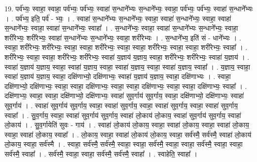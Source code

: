 \documentclass[17pt]{extarticle}
\begin{document}
19. पर्व॑भ्यः॒ स्वाहा॒ स्वाहा॒ पर्व॑भ्यः॒ पर्व॑भ्यः॒ स्वाहा॑ स॒न्धाने᳚भ्यः स॒न्धाने᳚भ्यः॒ स्वाहा॒ पर्व॑भ्यः॒ पर्व॑भ्यः॒ स्वाहा॑ स॒न्धाने᳚भ्यः । . पर्व॑भ्य॒ इति॒ पर्व॑ - भ्यः॒ । . स्वाहा॑ स॒न्धाने᳚भ्यः स॒न्धाने᳚भ्यः॒ स्वाहा॒ स्वाहा॑ स॒न्धाने᳚भ्यः॒ स्वाहा॒ स्वाहा॑ स॒न्धाने᳚भ्यः॒ स्वाहा॒ स्वाहा॑ स॒न्धाने᳚भ्यः॒ स्वाहा᳚ । . स॒न्धाने᳚भ्यः॒ स्वाहा॒ स्वाहा॑ स॒न्धाने᳚भ्यः स॒न्धाने᳚भ्यः॒ स्वाहा॒ शरी॑रेभ्यः॒ शरी॑रेभ्यः॒ स्वाहा॑ स॒न्धाने᳚भ्यः स॒न्धाने᳚भ्यः॒ स्वाहा॒ शरी॑रेभ्यः । . स॒न्धाने᳚भ्य॒ इति॑ सं - धाने᳚भ्यः । . स्वाहा॒ शरी॑रेभ्यः॒ शरी॑रेभ्यः॒ स्वाहा॒ स्वाहा॒ शरी॑रेभ्यः॒ स्वाहा॒ स्वाहा॒ शरी॑रेभ्यः॒ स्वाहा॒ स्वाहा॒ शरी॑रेभ्यः॒ स्वाहा᳚ । . शरी॑रेभ्यः॒ स्वाहा॒ स्वाहा॒ शरी॑रेभ्यः॒ शरी॑रेभ्यः॒ स्वाहा॑ य॒ज्ञाय॑ य॒ज्ञाय॒ स्वाहा॒ शरी॑रेभ्यः॒ शरी॑रेभ्यः॒ स्वाहा॑ य॒ज्ञाय॑ । . स्वाहा॑ य॒ज्ञाय॑ य॒ज्ञाय॒ स्वाहा॒ स्वाहा॑ य॒ज्ञाय॒ स्वाहा॒ स्वाहा॑ य॒ज्ञाय॒ स्वाहा॒ स्वाहा॑ य॒ज्ञाय॒ स्वाहा᳚ । . य॒ज्ञाय॒ स्वाहा॒ स्वाहा॑ य॒ज्ञाय॑ य॒ज्ञाय॒ स्वाहा॒ दक्षि॑णाभ्यो॒ दक्षि॑णाभ्यः॒ स्वाहा॑ य॒ज्ञाय॑ य॒ज्ञाय॒ स्वाहा॒ दक्षि॑णाभ्यः । . स्वाहा॒ दक्षि॑णाभ्यो॒ दक्षि॑णाभ्यः॒ स्वाहा॒ स्वाहा॒ दक्षि॑णाभ्यः॒ स्वाहा॒ स्वाहा॒ दक्षि॑णाभ्यः॒ स्वाहा॒ स्वाहा॒ दक्षि॑णाभ्यः॒ स्वाहा᳚ । . दक्षि॑णाभ्यः॒ स्वाहा॒ स्वाहा॒ दक्षि॑णाभ्यो॒ दक्षि॑णाभ्यः॒ स्वाहा॑ सुव॒र्गाय॑ सुव॒र्गाय॒ स्वाहा॒ दक्षि॑णाभ्यो॒ दक्षि॑णाभ्यः॒ स्वाहा॑ सुव॒र्गाय॑ । . स्वाहा॑ सुव॒र्गाय॑ सुव॒र्गाय॒ स्वाहा॒ स्वाहा॑ सुव॒र्गाय॒ स्वाहा॒ स्वाहा॑ सुव॒र्गाय॒ स्वाहा॒ स्वाहा॑ सुव॒र्गाय॒ स्वाहा᳚ । . सु॒व॒र्गाय॒ स्वाहा॒ स्वाहा॑ सुव॒र्गाय॑ सुव॒र्गाय॒ स्वाहा॑ लो॒काय॑ लो॒काय॒ स्वाहा॑ सुव॒र्गाय॑ सुव॒र्गाय॒ स्वाहा॑ लो॒काय॑ । . सु॒व॒र्गायेति॑ सुवः - गाय॑ । . स्वाहा॑ लो॒काय॑ लो॒काय॒ स्वाहा॒ स्वाहा॑ लो॒काय॒ स्वाहा॒ स्वाहा॑ लो॒काय॒ स्वाहा॒ स्वाहा॑ लो॒काय॒ स्वाहा᳚ । . लो॒काय॒ स्वाहा॒ स्वाहा॑ लो॒काय॑ लो॒काय॒ स्वाहा॒ सर्व॑स्मै॒ सर्व॑स्मै॒ स्वाहा॑ लो॒काय॑ लो॒काय॒ स्वाहा॒ सर्व॑स्मै । . स्वाहा॒ सर्व॑स्मै॒ सर्व॑स्मै॒ स्वाहा॒ स्वाहा॒ सर्व॑स्मै॒ स्वाहा॒ स्वाहा॒ सर्व॑स्मै॒ स्वाहा॒ स्वाहा॒ सर्व॑स्मै॒ स्वाहा᳚ । . सर्व॑स्मै॒ स्वाहा॒ स्वाहा॒ सर्व॑स्मै॒ सर्व॑स्मै॒ स्वाहा᳚ । . स्वाहेति॒ स्वाहा᳚ । \newline
\pagebreak
{}
\end{document}

